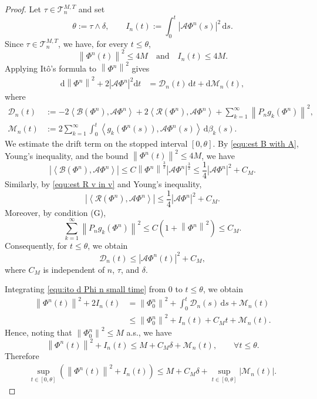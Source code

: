 \documentclass[10pt,a4paper]{amsart}
\newcommand{\abs}[1]{\left|{#1}\right|}
\newcommand{\dt}{\mathrm{d}t}
\newcommand{\inpro}[2]{\left\langle#1,#2\right\rangle}
\newcommand{\norm}[1]{\left\|{#1}\right\|}
\begin{document}
\begin{proof}
	Let $\tau\in\mathcal T_n^{M,T}$ and set
	\[
	\theta:=\tau\wedge\delta,
	\qquad
	I_n(t):=
	\int_0^t
	\abs{\mathcal A\Phi^n(s)}^2\,\mathrm ds .
	\]
	Since $\tau\in\mathcal T_n^{M,T}$, we have, for every $t\leq \theta$,
	\[
	\norm{\Phi^n(t)}^2\leq 4M \quad \text{and}
	\quad
	I_n(t)\leq 4M .
	\]
	Applying It\^o's formula to $\norm{\Phi^n}^2$ gives
	\begin{align}\label{equ:ito d Phi n small time}
		\mathrm{d} \norm{\Phi^{n}}^2
		+
		2 \abs{\mathcal{A} \Phi^{n}}^2 \dt
		&=
		\mathcal{D}_n(t)\,\dt
		+
		\mathrm d\mathcal M_n(t),
	\end{align}
	where
	\begin{align*}
	\mathcal{D}_n(t)
		&:=
		-2\inpro{\mathcal{B}(\Phi^n)}{\mathcal{A}\Phi^{n}}
		+
		2\inpro{\mathcal{R}(\Phi^n)}{\mathcal{A} \Phi^{n}}
		+
		\sum_{k=1}^\infty \norm{P_n g_k(\Phi^n)}^2,
		\\
		\mathcal M_n(t)
		&:=
		2\sum_{k=1}^\infty
		\int_0^t
		\inpro{g_k(\Phi^n(s))}{\mathcal A\Phi^n(s)}
		\,\mathrm d\beta_k(s).
	\end{align*}
	We estimate the drift term on the stopped interval $[0,\theta]$. By
	\eqref{equ:est B with A}, Young's inequality, and the bound
	$\norm{\Phi^n(t)}^2\leq 4M$, we have
	\[
	\abs{\inpro{\mathcal B(\Phi^n)}{\mathcal A\Phi^n}}
	\leq
	C\norm{\Phi^n}^{\frac32}
	\abs{\mathcal A\Phi^n}^{\frac32}
	\leq
	\frac14\abs{\mathcal A\Phi^n}^2+C_M .
	\]
	Similarly, by \eqref{equ:est R v in v} and Young's inequality,
	\[
	\abs{\inpro{\mathcal R(\Phi^n)}{\mathcal A\Phi^n}}
	\leq
	\frac14\abs{\mathcal A\Phi^n}^2+C_M .
	\]
	Moreover, by condition {\rm (G)},
	\[
	\sum_{k=1}^\infty \norm{P_n g_k(\Phi^n)}^2
	\leq
	C\left(1+\norm{\Phi^n}^2\right)
	\leq C_M .
	\]
	Consequently, for $t\leq\theta$, we obtain
	\[
	\mathcal{D}_n(t)\leq \abs{\mathcal A\Phi^n(t)}^2+C_M,
	\]
	where $C_M$ is independent of $n$, $\tau$, and $\delta$.
	
	Integrating \eqref{equ:ito d Phi n small time} from $0$ to $t\leq\theta$,
	we obtain
	\[
	\begin{aligned}
		\norm{\Phi^n(t)}^2+2I_n(t)
		&=
		\norm{\Phi_0^n}^2
		+
		\int_0^t \mathcal{D}_n(s)\,\mathrm ds
		+
		\mathcal M_n(t)
		\\
		&\leq
		\norm{\Phi_0^n}^2
		+
		I_n(t)
		+
		C_Mt
		+
		\mathcal M_n(t).
	\end{aligned}
	\]
	Hence, noting that $\norm{\Phi_0^n}^2\leq M$ a.s., we have
	\[
	\norm{\Phi^n(t)}^2+I_n(t)
	\leq
	M+C_M\delta+\mathcal M_n(t),
	\qquad \forall t\leq\theta .
	\]
	Therefore
	\begin{align}\label{equ:running-energy-bound}
		\sup_{t\in[0,\theta]}
		\left(
		\norm{\Phi^n(t)}^2+I_n(t)
		\right)
		\leq
		M+C_M\delta
		+
		\sup_{t\in[0,\theta]}\abs{\mathcal M_n(t)} .
	\end{align}
	

\end{proof}
\end{document}
